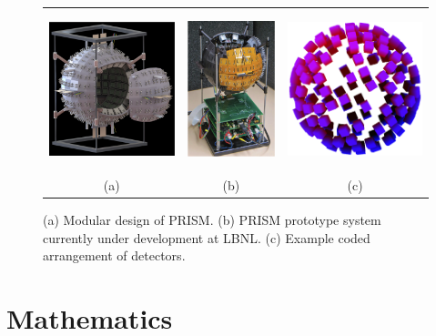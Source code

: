 \documentclass[10pt]{article}
\begin{document}
\begin{figure}[htb]
\hypertarget{fig1}{}
\centering
\begin{tabular}{ccc}
	\includegraphics[height=130pt]{Figures/PRISM_Design.png} & 
	\includegraphics[height=130pt]{Figures/PRISM_Prototype.png} & 
	\includegraphics[height=130pt]{Figures/Masked_Configuration.png} \\
	\scriptsize{(a)} & \scriptsize{(b)} & \scriptsize{(c)} \\[-6pt]
\end{tabular}
\caption{(a) Modular design of PRISM. (b) PRISM prototype system currently under development at LBNL. (c) Example coded arrangement of detectors.}
\end{figure}






\section{Mathematics}
\end{document}
